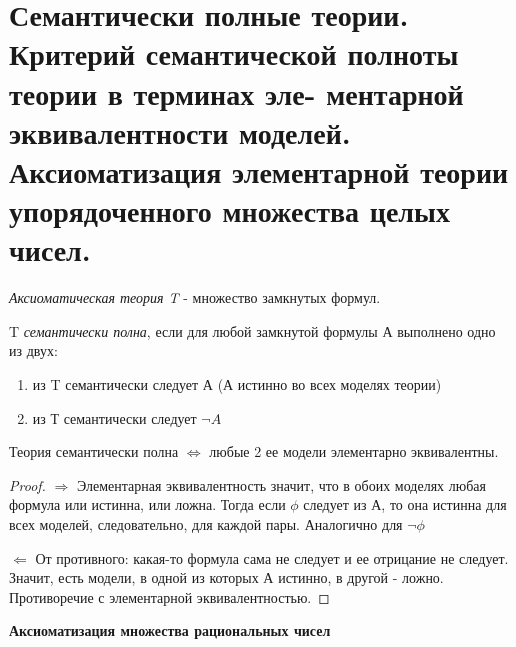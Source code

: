 \documentclass{article}
\begin{document}
\setcounter{section}{26}
\section{Семантически полные теории. Критерий семантической полноты теории в терминах эле-
ментарной эквивалентности моделей. Аксиоматизация элементарной теории упорядоченного
множества целых чисел.}

\begin{definition}\textit{Аксиоматическая теория T} - множество замкнутых формул.
\end{definition}

T \textit{семантически полна}, если для любой замкнутой формулы А выполнено одно из двух:
\begin{enumerate}
    \item из T семантически следует А (А истинно во всех моделях теории)
    \item из Т семантически следует \(\neg A\)
\end{enumerate}

\begin{lemma}
Теория семантически полна \(\Longleftrightarrow\) любые 2 ее модели элементарно эквивалентны.
\end{lemma}
\begin{proof}

\(\Rightarrow\) Элементарная эквивалентность значит, что в обоих моделях любая формула или истинна, или ложна. Тогда если \(\phi\) следует из А, то она истинна для всех моделей, следовательно, для каждой пары. Аналогично для \(\neg \phi\)

\(\Leftarrow\) От противного: какая-то формула сама не следует и ее отрицание не следует. Значит, есть модели, в одной из которых А истинно, в другой - ложно. Противоречие с элементарной эквивалентностью.

\end{proof}

\noindent\textbf{Аксиоматизация множества рациональных чисел}
\vspace{2mm}
\end{document}
